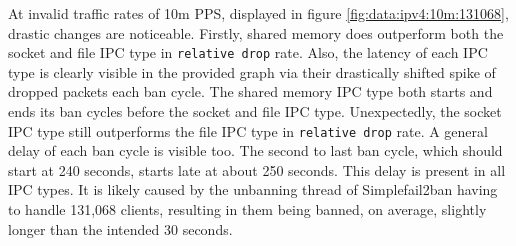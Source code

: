 At invalid traffic rates of 10m \ac{PPS}, displayed in figure \ref{fig:data:ipv4:10m:131068}, drastic changes are noticeable.
Firstly, shared memory does outperform both the socket and file \ac{IPC} type in \texttt{relative drop} rate.
Also, the latency of each \ac{IPC} type is clearly visible in the provided graph via their drastically shifted spike of dropped packets each ban cycle.
The shared memory \ac{IPC} type both starts and ends its ban cycles before the socket and file \ac{IPC} type.
Unexpectedly, the socket \ac{IPC} type still outperforms the file \ac{IPC} type in \texttt{relative drop} rate.
A general delay of each ban cycle is visible too.
The second to last ban cycle, which should start at 240 seconds, starts late at about 250 seconds.
This delay is present in all \ac{IPC} types. 
It is likely caused by the unbanning thread of Simplefail2ban having to handle 131,068 clients, resulting in them being banned, on average, slightly longer than the intended 30 seconds.

